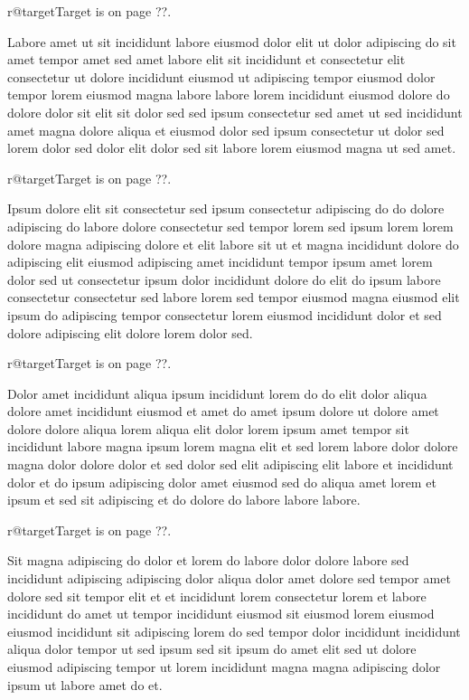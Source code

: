 \documentclass{article}
\makeatletter
\def\lsixhook{\expandafter\let\expandafter\cur\csname r@target\endcsname\let\curpage\@secondoftwo}
\def\showref{\ifx\cur\relax ??\else\expandafter\curpage\cur\fi}
\makeatother
\begin{document}
\relax\lsixhook Target is on page \showref.

Labore amet ut sit incididunt labore eiusmod dolor elit ut dolor adipiscing do sit amet tempor amet sed amet labore elit sit incididunt et consectetur elit consectetur ut dolore incididunt eiusmod ut adipiscing tempor eiusmod dolor tempor lorem eiusmod magna labore labore lorem incididunt eiusmod dolore do dolore dolor sit elit sit dolor sed sed ipsum consectetur sed amet ut sed incididunt amet magna dolore aliqua et eiusmod dolor sed ipsum consectetur ut dolor sed lorem dolor sed dolor elit dolor sed sit labore lorem eiusmod magna ut sed amet.

\relax\lsixhook Target is on page \showref.

Ipsum dolore elit sit consectetur sed ipsum consectetur adipiscing do do dolore adipiscing do labore dolore consectetur sed tempor lorem sed ipsum lorem lorem dolore magna adipiscing dolore et elit labore sit ut et magna incididunt dolore do adipiscing elit eiusmod adipiscing amet incididunt tempor ipsum amet lorem dolor sed ut consectetur ipsum dolor incididunt dolore do elit do ipsum labore consectetur consectetur sed labore lorem sed tempor eiusmod magna eiusmod elit ipsum do adipiscing tempor consectetur lorem eiusmod incididunt dolor et sed dolore adipiscing elit dolore lorem dolor sed.

\relax\lsixhook Target is on page \showref.

Dolor amet incididunt aliqua ipsum incididunt lorem do do elit dolor aliqua dolore amet incididunt eiusmod et amet do amet ipsum dolore ut dolore amet dolore dolore aliqua lorem aliqua elit dolor lorem ipsum amet tempor sit incididunt labore magna ipsum lorem magna elit et sed lorem labore dolor dolore magna dolor dolore dolor et sed dolor sed elit adipiscing elit labore et incididunt dolor et do ipsum adipiscing dolor amet eiusmod sed do aliqua amet lorem et ipsum et sed sit adipiscing et do dolore do labore labore labore.

\relax\lsixhook Target is on page \showref.

Sit magna adipiscing do dolor et lorem do labore dolor dolore labore sed incididunt adipiscing adipiscing dolor aliqua dolor amet dolore sed tempor amet dolore sed sit tempor elit et et incididunt lorem consectetur lorem et labore incididunt do amet ut tempor incididunt eiusmod sit eiusmod lorem eiusmod eiusmod incididunt sit adipiscing lorem do sed tempor dolor incididunt incididunt aliqua dolor tempor ut sed ipsum sed sit ipsum do amet elit sed ut dolore eiusmod adipiscing tempor ut lorem incididunt magna magna adipiscing dolor ipsum ut labore amet do et.
\end{document}
